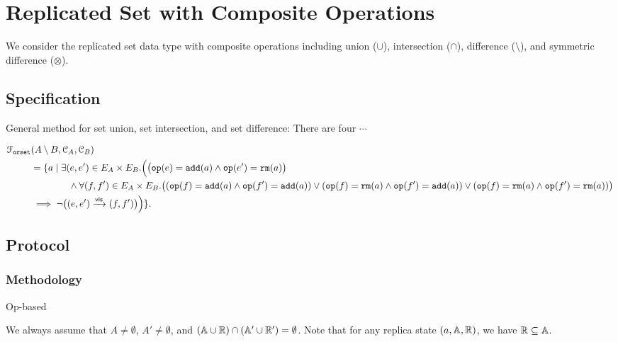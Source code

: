 
\section{Replicated Set with Composite Operations}

We consider the replicated set data type with composite operations 
including union ($\cup$), intersection ($\cap$), difference ($\setminus$),
and symmetric difference ($\otimes$).

\subsection{Specification}	\label{ss:rset-composite-spec}

General method for set union, set intersection, and set difference:
There are four $\cdots$

\begin{align}
  \mathcal{F}_{\texttt{orset}}&(A \setminus B, \mathcal{C}_{A}, \mathcal{C}_{B}) \\
  &= \{ a \mid \exists (e, e') \in E_A \times E_B. 
  	\Big( \big(\texttt{op}(e) = \texttt{add}(a) \land \texttt{op}(e') = \texttt{rm}(a)\big) \\
      	    &\qquad\qquad \land \forall (f, f') \in E_A \times E_B. 
      	        \big( (\texttt{op}(f) = \texttt{add}(a) \land \texttt{op}(f') = \texttt{add}(a)) 
		      \lor (\texttt{op}(f) = \texttt{rm}(a) \land \texttt{op}(f') = \texttt{add}(a)) 
		      \lor (\texttt{op}(f) = \texttt{rm}(a) \land \texttt{op}(f') = \texttt{rm}(a)) 
		\big) \\
	    & \implies \lnot \big((e, e') \xrightarrow{\textsf{vis}} (f, f')\big)
	\Big)
	      \}.
\end{align}

\begin{example}
\end{example}

\subsection{Protocol}		\label{ss:rset-composite-protocol}

\subsubsection{Methodology}	\label{sss:rset-methodology}

Op-based

We always assume that $A \neq \emptyset$, $A' \neq \emptyset$,
and $(\mathbb{A} \cup \mathbb{R}) \cap (\mathbb{A}' \cup \mathbb{R}') = \emptyset$.
Note that for any replica state $(a, \mathbb{A}, \mathbb{R})$, we have $\mathbb{R} \subseteq \mathbb{A}$.

